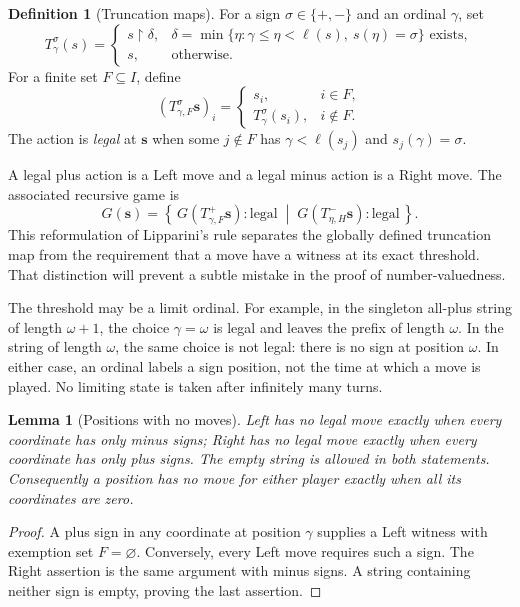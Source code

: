 \documentclass[11pt,letterpaper]{article}
\newtheorem{lemma}[theorem]{Lemma}
\theoremstyle{definition}
\newtheorem{definition}[theorem]{Definition}
\theoremstyle{remark}
\newcommand{\bs}{\boldsymbol{s}}
\newcommand{\len}{\ell}
\newcommand{\cut}[2]{\left\{\,#1\;\middle|\;#2\,\right\}}
\newcommand{\pref}[2]{#1\mathbin{\restriction}#2}
\newcommand{\signplus}{\mathtt{+}}
\newcommand{\signminus}{\mathtt{-}}
\begin{document}
\begin{definition}[Truncation maps]\label{def:truncation}
For a sign $\sigma\in\{\signplus,\signminus\}$ and an ordinal $\gamma$, set
\begin{equation}\label{eq:single-truncate}
 T^\sigma_\gamma(s)=
 \begin{cases}
 \pref{s}{\delta},&
 \delta=\min\{\eta:\gamma\leq\eta<\len(s),\ s(\eta)=\sigma\}
 \text{ exists},\\
 s,&\text{otherwise}.
 \end{cases}
\end{equation}
For a finite set $F\subseteq I$, define
\begin{equation}\label{eq:family-truncate}
 (T^\sigma_{\gamma,F}\bs)_i=
 \begin{cases}s_i,&i\in F,\\T^\sigma_\gamma(s_i),&i\notin F.\end{cases}
\end{equation}
The action is \emph{legal} at $\bs$ when some $j\notin F$ has
$\gamma<\len(s_j)$ and $s_j(\gamma)=\sigma$.
\end{definition}

A legal plus action is a Left move and a legal minus action is a Right move.
The associated recursive game is
\begin{equation}\label{eq:game-definition}
 G(\bs)=\cut{G(T^+_{\gamma,F}\bs):\text{legal}}
                  {G(T^-_{\eta,H}\bs):\text{legal}}.
\end{equation}
This reformulation of Lipparini's rule \cite[Remark~7.6(3)]{lipparini2026}
separates the globally defined truncation map from the requirement that a move
have a witness at its exact threshold. That distinction will prevent a subtle
mistake in the proof of number-valuedness.

The threshold may be a limit ordinal. For example, in the singleton all-plus
string of length $\omega+1$, the choice $\gamma=\omega$ is legal and leaves
the prefix of length $\omega$. In the string of length $\omega$, the same
choice is not legal: there is no sign at position $\omega$. In either case,
an ordinal labels a sign position, not the time at which a move is played.
No limiting state is taken after infinitely many turns.

\begin{lemma}[Positions with no moves]\label{lem:terminal}
Left has no legal move exactly when every coordinate has only minus signs;
Right has no legal move exactly when every coordinate has only plus signs.
The empty string is allowed in both statements. Consequently a position has
no move for either player exactly when all its coordinates are zero.
\end{lemma}
\begin{proof}
A plus sign in any coordinate at position $\gamma$ supplies a Left witness
with exemption set $F=\varnothing$. Conversely, every Left move requires such
a sign. The Right assertion is the same argument with minus signs. A string
containing neither sign is empty, proving the last assertion.
\end{proof}
\end{document}
